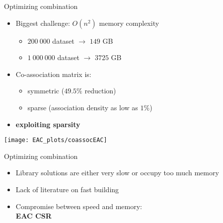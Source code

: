 \begin{frame}{Optimizing combination}

\begin{itemize}

\item Biggest challenge: $O(n^2)$ memory complexity
  \begin{itemize}
  \item $200\:000$ dataset $\longrightarrow$ $149$ GB
  \item $1\:000\:000$ dataset $\longrightarrow$ $3725$ GB
  \end{itemize}

\item Co-association matrix is:
  \begin{itemize}
  \item symmetric ($49.5\%$ reduction)
  \item sparse (association density as low as $1\%$)
  \end{itemize}

\item \textbf{exploiting sparsity}


\end{itemize}

\begin{center}
\texttt{[image: EAC\_plots/coassocEAC]}
\end{center}

\end{frame}



\begin{frame}{Optimizing combination}

\begin{itemize}


\item Library solutions are either very slow or occupy too much memory

\item Lack of literature on fast building

\item Compromise between speed and memory: \\
\centering
\Large{\textbf{EAC CSR}}


\end{itemize}

\end{frame}


